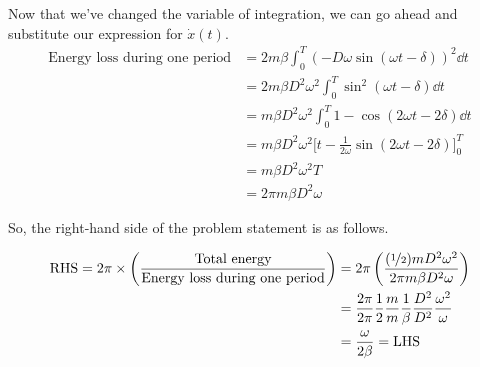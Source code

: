\documentclass{article}
\begin{document}
Now that we've changed the variable of integration, we can go ahead and substitute our expression for $\dot{x}(t)$.
\begin{equation*}
\begin{aligned}
\text{Energy loss during one period} &= 2m\beta\int_0^T(-D\omega\sin(\omega t-\delta))^2\dd t \\
&= 2m\beta D^2\omega^2\int_0^T\sin^2(\omega t-\delta)\dd t \\
&= m\beta D^2\omega^2\int_0^T 1 - \cos(2\omega t-2\delta)\dd t \\
&= m\beta D^2\omega^2\Bigg[t - \frac{1}{2\omega}\sin(2\omega t-2\delta)\Bigg]_0^T \\
&= m\beta D^2\omega^2T \\
&= 2\pi m\beta D^2\omega
\end{aligned}
\end{equation*}

So, the right-hand side of the problem statement is as follows.

\begin{equation*}
\begin{aligned}
\text{RHS} = 2\pi \times \left(\frac{\text{Total energy}}{\text{Energy loss during one period}}\right) &= 2\pi\left(\frac{(\nicefrac{1}{2})mD^2\omega^2}{2\pi m\beta D^2\omega}\right) \\
&= \frac{2\pi}{2\pi}\frac{1}{2}\frac{m}{m}\frac{1}{\beta}\frac{D^2}{D^2}\frac{\omega^2}{\omega} \\
&= \frac{\omega}{2\beta} = \text{LHS}
\end{aligned}
\end{equation*}
\end{document}

